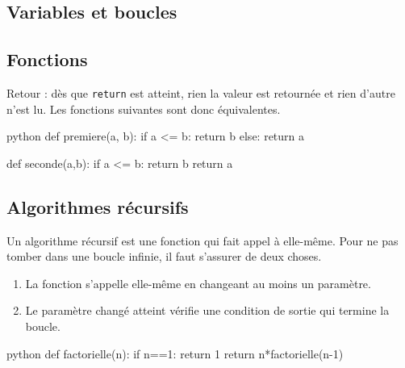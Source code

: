 \subsection{Variables et boucles}



\subsection{Fonctions}

Retour : dès que \texttt{return} est atteint, rien la valeur est retournée et rien d'autre n'est lu.
Les fonctions suivantes sont donc équivalentes.

\begin{mintedbox}{python}
def premiere(a, b):
	if a <= b:
		return b
	else:
		return a
		
def seconde(a,b):
	if a <= b:
		return b
	return a
\end{mintedbox}

\subsection{Algorithmes récursifs}

Un algorithme récursif est une fonction qui fait appel à elle-même.
Pour ne pas tomber dans une boucle infinie, il faut s'assurer de deux choses.
	\begin{enumerate}
		\item La fonction s'appelle elle-même en changeant au moins un paramètre.
		\item Le paramètre changé atteint vérifie une condition de sortie qui termine la boucle.
	\end{enumerate}

\begin{mintedbox}{python}
def factorielle(n):
	if n==1:
		return 1
	return n*factorielle(n-1)
\end{mintedbox}

